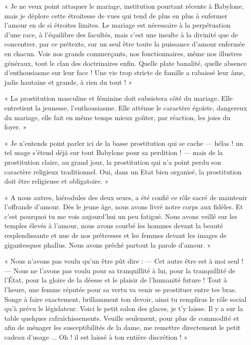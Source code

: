 \documentclass[a4paper, 11pt, oneside, polutonikogreek, french]{article}
\begin{document}
« Je ne veux point attaquer le mariage, institution pourtant récente à Babylone, mais je déplore cette étroitesse de vues qui tend de plus en plus à enfermer l'amour en de si étroites limites. Le mariage est nécessaire à la perpétuation d'une race, à l'équilibre des facultés, mais c'est une insulte à la divinité que de concentrer, par ce prétexte, sur un seul être toute la puissance d'amour enfermée en chacun. Vois nos grands commerçants, nos fonctionnaires, même nos illustres généraux, tout le clan des doctrinaires enfin. Quelle plate banalité, quelle absence d'enthousiasme sur leur face ! Une vie trop stricte de famille a rabaissé leur âme, jadis hautaine et grande, à rien du tout ! »

« La prostitution masculine et féminine doit subsistera côté du mariage. Elle entretient la jeunesse, l'enthousiasme. Elle atténue le caractère égoïste, dangereux du mariage, elle fait en même temps mieux goûter, par réaction, les joies du foyer. »

« Je n'entends point parler ici de la basse prostitution qui se cache --- hélas ! un tel usage s'étend déjà sur tout Babylone pour sa perdition ! --- mais de la prostitution claire, au grand jour, la prostitution qui n'a point perdu son caractère religieux traditionnel. Oui, dans un Etat bien organisé, la prostitution doit être religieuse et obligatoire. »

« A nous autres, hiérodules des deux sexes, a été confié ce rôle sacré de maintenir l'offrande d'amour. Dès le jeune âge, nous avons livré notre corps aux fidèles. Et c'est pourquoi tu me vois aujourd'hui un peu fatigué. Nous avons veillé sur les temples élevés à l'amour, nous avons courbé les hommes devant la beauté resplendissante et nue de nos prêtresses et les femmes devant les images de gigantesques phallus. Nous avons prêché partout la parole d'amour. »

« Nous n'avons pas voulu qu'un être pût dire : --- Cet autre être est à moi seul ! --- Nous ne l'avons pas voulu pour sa tranquillité à lui, pour la tranquillité de l'État, pour la gloire de la déesse et le plaisir de l'humanité future ! Tout à l'heure, une femme réputée pour sa vertu va venir se prostituer entre tes bras. Songe à faire exactement, brillamment ton devoir, ainsi tu rempliras le rôle social qu'à prévu le législateur. Voici le petit salon des glaces, je t'y laisse. Il y a sur la table quelques rafraîchissements. Veuille seulement, pour plus de commodité et afin de ménager les susceptibilités de la dame, me remettre directement le petit cadeau d'usage ... Oh ! il est laissé à ton entière discrétion ! »
\end{document}

